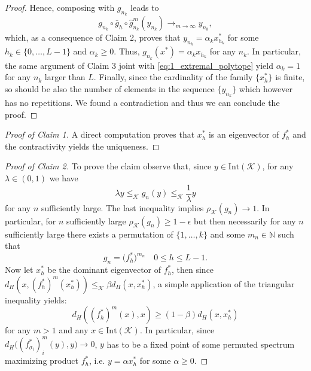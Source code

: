 \documentclass{article}
\newcommand{\N}{\mathbb{N}}
\newcommand{\cradius}{\rho_{\cone}}
\newcommand{\cone}{\mathcal{K}}
\newcommand{\interior}{\mathrm{Int}}
\newcommand{\dist}{d_H}
\newcommand{\cleq}{\leq_{\cone}}
\begin{document}
\begin{proof}
Hence, composing with $g_{n_k}$ leads to 
%
\begin{equation}
g_{n_k}\circ \bar{g}_h\circ\hat{g}_{n_k}^m(y_{n_k})\longrightarrow_{m\rightarrow \infty} y_{n_k},
\end{equation}
which, as a consequence of Claim 2, proves that $y_{n_k}=\alpha_k x_{h_k}^*$ for some $h_k\in\{0,\dots,L-1\}$ and $\alpha_k\geq 0$. Thus, $g_{n_k}(x^*)=\alpha_k x_{h_k}$ for any $n_k$. In particular, the same argument of Claim 3 joint with \eqref{eq:1_extremal_polytope} yield $\alpha_k=1$ for any $n_k$ larger than $L$. 
Finally, since the cardinality of the family $\{x_h^*\}$ is finite, so should be also the number of elements in the sequence $\{y_{n_k}\}$ which however has no repetitions. We found a contradiction and thus we can conclude the proof.
\end{proof}
\begin{proof}[Proof of Claim 1]
   A direct computation proves that $x_{h}^*$ is an eigenvector of $f_h^*$ and the contractivity yields the uniqueness.
\end{proof}
\begin{proof}[Proof of Claim 2]
    To prove the claim observe that, since $y\in \interior(\cone)$, for any $\lambda\in(0,1)$ we have 
\begin{equation}
    \lambda y\cleq g_n(y) \cleq \frac{1}{\lambda} y
\end{equation}
for any $n$ sufficiently large. The last inequality implies $\cradius(g_n)\rightarrow 1$. In particular, for $n$ sufficiently large $\cradius(g_n)\geq 1-\epsilon$ but then necessarily for any $n$ sufficiently large there exists a permutation of $\{1,\dots,k\}$ and some $m_n\in \N$ such that 
\begin{equation}
    g_n=\big( f_h^* \big)^{m_n} \quad 0\leq h\leq L-1.
\end{equation} 
Now let $x_{h}^*$ be the dominant eigenvector of $f_{h}^*$, then since $\dist(x,(f^*_h)^m(x_h^*))\cleq \beta \dist(x,x_h^*)$, a simple application of the triangular inequality yields:
\begin{equation}
    \dist((f_h^*)^m(x),x)\geq (1-\beta)\dist(x,x_{h}^*)
\end{equation}
for any $m>1$ and any $x\in \interior(\cone)$. In particular, since $\dist\big((f_{\sigma_i}^*)^m_i(y),y\big)\rightarrow 0$, $y$ has to be a fixed point of some permuted spectrum maximizing product $f_{h}^*$, i.e. $y=\alpha x_{h}^*$ for some $\alpha\geq 0$.
\end{proof}
\end{document}
